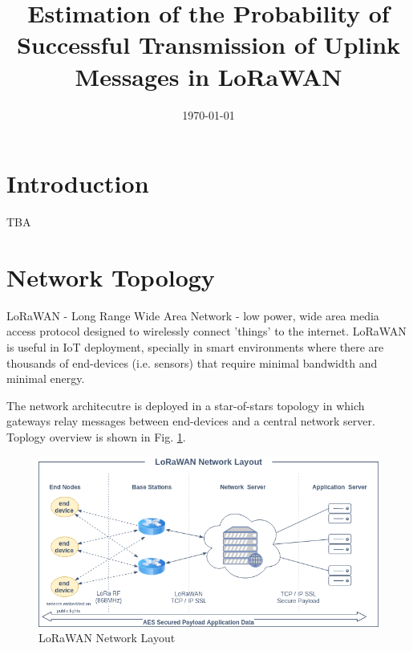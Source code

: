 \documentclass[10pt, a4paper]{article} %
\title{Estimation of the Probability of Successful Transmission of Uplink Messages in LoRaWAN} %
\author{
	\authorstyle{Ante Lojić Kapetanović}
	\newline\newline %
	\institution{University of Split, Split, Croatia}
}
\date{\today} %
\begin{document}
\maketitle %

\thispagestyle{firstpage} %




\section{Introduction}
TBA

\section{Network Topology}

LoRaWAN - Long Range Wide Area Network - low power, wide area media access protocol designed to wirelessly connect 'things' to the internet. LoRaWAN is useful in IoT deployment, specially in smart environments where there are thousands of end-devices (i.e. sensors) that require minimal bandwidth and minimal energy.

The network architecutre is deployed in a star-of-stars topology in which gateways relay messages between end-devices and a central network server. \cite{Silva_LoRaWAN}
Toplogy overview is shown in Fig. \ref{lorawan}.
\begin{figure}
	\includegraphics[width=\linewidth]{images/LoRaWAN-Network-Layout.png} %
	\caption{LoRaWAN Network Layout} %
	\label{lorawan} %
\end{figure}
\end{document}
